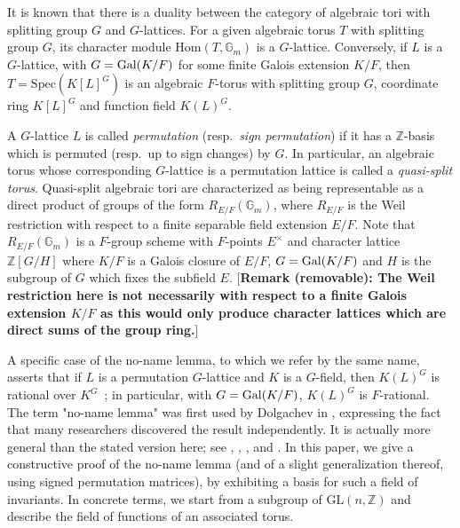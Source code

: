\documentclass[12pt]{article}
\theoremstyle{plain}
\newcommand{\Z}{\ensuremath{\mathbb{Z}}}
\begin{document}
It is known that there is a duality between the category of algebraic
tori with splitting group $G$ and $G$-lattices. For a given algebraic
torus $T$ with splitting group $G$, its character module
$\mathrm{Hom}(T,\mathbb{G}_m)$ is a $G$-lattice. Conversely, if $L$ is
a $G$-lattice, with $G={\rm Gal}(K/F)$ for some finite Galois
extension $K/F$, then $T=\mathrm{Spec}(K[L]^G)$ is an algebraic
$F$-torus with splitting group $G$, coordinate ring $K[L]^G$ and
function field $K(L)^G$.

A $G$-lattice $L$ is called {\em permutation} (resp.\ {\em sign
  permutation}) if it has a $\Z$-basis which is permuted (resp.\ up to
sign changes) by $G$. In particular, an algebraic torus whose
corresponding $G$-lattice is a permutation lattice is called a {\em
  quasi-split torus}. Quasi-split algebraic tori 
  are characterized as being
representable as a direct product of groups of the form
$R_{E/F}(\mathbb{G}_m)$, where $R_{E/F}$ is the Weil restriction with 
respect to a finite separable field extension $E/F$.
Note that $R_{E/F}(\mathbb{G}_m)$ is a $F$-group scheme with $F$-points $E^{\times}$ and 
character lattice $\Z[G/H]$ where $K/F$ is a Galois closure of $E/F$, $G={\rm Gal}(K/F)$ and $H$ is the 
subgroup of $G$ which fixes the subfield $E$.
[\textbf{Remark (removable): The Weil restriction here is not necessarily with respect to a finite Galois extension $K/F$
as this would only produce character lattices which are direct sums of the group ring.}]

A specific case of the no-name lemma, to which we refer by the same name, 
asserts that if $L$ is a permutation $G$-lattice and
$K$ is a $G$-field, then $K(L)^G$ is rational over
$K^G$~\cite[Chapter~9.4]{Lorenz}; in particular, with $G={\rm
  Gal}(K/F)$, $K(L)^G$ is $F$-rational. The term "no-name lemma" was first used 
by Dolgachev in \cite{Dolgachev}, expressing the fact that many researchers 
discovered the result independently. It is actually more general than the stated 
version here; see \cite[p. 6]{Dolgachev}, \cite[Section 3.2]{Sansuc}, \cite[Proposition 1.3]{Lenstra}, \cite[Remark 2.4]{Domokos} and \cite[Proposition 1.1]{EndoMiyata}.  In this paper, we give a
constructive proof of  the no-name lemma (and of a slight generalization
thereof, using signed permutation matrices), by exhibiting a basis for
such a field of invariants.  In concrete terms, we start from a
subgroup of $\mathrm{GL}(n,\Z)$ and describe the field of functions of
an associated torus.
\end{document}
